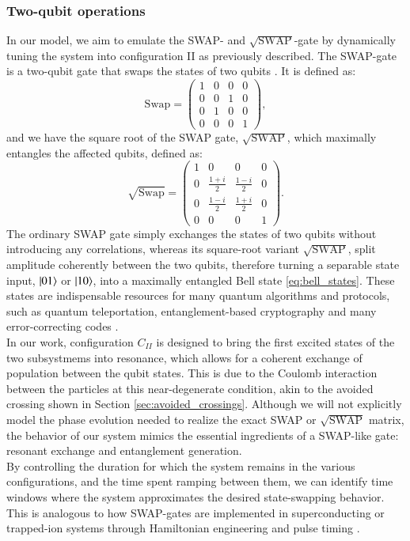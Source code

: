 \documentclass{subfiles}
\begin{document}
\subsubsection*{Two-qubit operations}
In our model, we aim to emulate the SWAP- and $\sqrt{\text{SWAP}}$-gate by dynamically tuning the system into configuration II as previously described. The SWAP-gate is a two-qubit gate that swaps the states of two qubits \cite{nielsen2010quantum}. It is defined as:
\begin{equation}
    \text{Swap} = \begin{pmatrix}
    1 & 0 & 0 & 0 \\
    0 & 0 & 1 & 0 \\
    0 & 1 & 0 & 0 \\
    0 & 0 & 0 & 1
    \end{pmatrix} \label{eq:swap_gate},
\end{equation}
and we have the square root of the SWAP gate, $\sqrt{\text{SWAP}}$, which maximally entangles the affected qubits, defined as:
\begin{equation}
    \sqrt{\text{Swap}} = \begin{pmatrix}
    1 & 0 & 0 & 0 \\
    0 & \frac{1+i}{2} & \frac{1-i}{2} & 0 \\
    0 & \frac{1-i}{2} & \frac{1+i}{2} & 0 \\
    0 & 0 & 0 & 1
    \end{pmatrix} \label{eq:sqrt_swap_gate}.
\end{equation}
The ordinary SWAP gate simply exchanges the states of two qubits without introducing any correlations, whereas its square-root variant $\sqrt{\text{SWAP}}$, split amplitude coherently between the two qubits, therefore turning a separable state input, $\ket{01}$ or $\ket{10}$, into a maximally entangled Bell state \eqref{eq:bell_states}. These states are indispensable resources for many quantum algorithms and protocols, such as quantum teleportation, entanglement-based cryptography and many error-correcting codes \cite{nielsen2010quantum, bouwmeester1997experimental, yin2020entanglement}. 
\\
In our work, configuration $C_{II}$ is designed to bring the first excited states of the two subsystmems into resonance, which allows for a coherent exchange of population between the qubit states. This is due to the Coulomb interaction between the particles at this near-degenerate condition, akin to the avoided crossing shown in Section \ref{sec:avoided_crossings}. Although we will not explicitly model the phase evolution needed to realize the exact SWAP or $\sqrt{\text{SWAP}}$ matrix, the behavior of our system mimics the essential ingredients of a SWAP-like gate: resonant exchange and entanglement generation. \\
By controlling the duration for which the system remains in the various configurations, and the time spent ramping between them, we can identify time windows where the system approximates the desired state-swapping behavior. This is analogous to how SWAP-gates are implemented in superconducting or trapped-ion systems through Hamiltonian engineering and pulse timing \cite{picard2025entanglement}. \\
\end{document}
